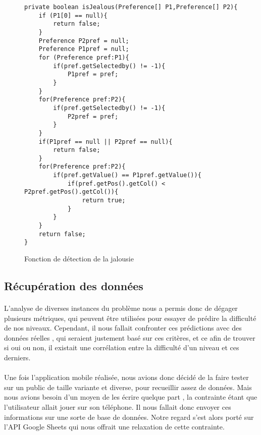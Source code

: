 \documentclass[../main.tex]{subfiles}
\begin{document}
\begin{figure}[ht!]
\begin{lstlisting}
private boolean isJealous(Preference[] P1,Preference[] P2){
    if (P1[0] == null){
        return false;
    }
    Preference P2pref = null;
    Preference P1pref = null;
    for (Preference pref:P1){
        if(pref.getSelectedby() != -1){
            P1pref = pref;
        }
    }
    for(Preference pref:P2){
        if(pref.getSelectedby() != -1){
            P2pref = pref;
        }
    }
    if(P1pref == null || P2pref == null){
        return false;
    }
    for(Preference pref:P2){
        if(pref.getValue() == P1pref.getValue()){
            if(pref.getPos().getCol() < P2pref.getPos().getCol()){
                return true;
            }
        }
    }
    return false;
}
\end{lstlisting}
\caption{Fonction de détection de la jalousie}
\label{detection-jalousie}
\end{figure}



	\subsection{Récupération des données}
	
	\paragraph{}
	L’analyse de diverses instances du problème nous a permis donc de dégager plusieurs métriques, qui peuvent être utilisées pour essayer de prédire la difficulté de nos niveaux. Cependant, il nous fallait confronter ces prédictions avec des données réelles , qui seraient justement basé sur ces critères, et ce afin de trouver si oui ou non, il existait une corrélation entre la difficulté d’un niveau et ces derniers. 
	\paragraph{}
Une fois l’application mobile réalisée, nous avions donc décidé de la faire tester sur un public de taille variante et diverse, pour recueillir assez de données. Mais nous avions besoin d’un moyen de les écrire quelque part , la contrainte étant que l’utilisateur allait jouer sur son téléphone. Il nous fallait donc envoyer ces informations sur une sorte de base de données. Notre regard s’est alors porté sur l’API Google Sheets qui nous offrait une relaxation de cette contrainte.
\end{document}
